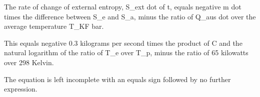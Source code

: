 The rate of change of external entropy, S_ext dot of t, equals negative m dot times the difference between S_e and S_a, minus the ratio of Q_aus dot over the average temperature T_KF bar.

This equals negative 0.3 kilograms per second times the product of C and the natural logarithm of the ratio of T_e over T_p, minus the ratio of 65 kilowatts over 298 Kelvin.

The equation is left incomplete with an equals sign followed by no further expression.